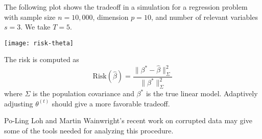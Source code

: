 \documentclass[12pt]{imsart}
\numberwithin{equation}{section}
\theoremstyle{plain}
\theoremstyle{remark}
\let\hat\widehat
\let\hat\widehat
\let\hat\widehat
\let\hat\widehat
\def\thetas#1{\theta^{(#1)}}
\begin{document}
The following plot shows the tradeoff in a simulation for a regression problem with
sample size $n=10{,}000$, dimension $p=10$, and number of relevant
variables $s=3$.  We take $T=5$.  

\begin{center}
  \texttt{[image: risk-theta]}
\end{center}

The risk is computed as
\begin{equation}
\text{Risk}(\hat \beta) = \frac{\|\beta^* - \hat\beta\|_{\Sigma}^2}{\|\beta^*\|_{\Sigma}^2}
\end{equation}
where $\Sigma$ is the population covariance and $\beta^*$ is the true
linear model. Adaptively adjusting $\thetas{t}$ should give a more
favorable tradeoff.

Po-Ling Loh and Martin Wainwright's recent work on corrupted data may
give some of the tools needed for analyzing this procedure.
\end{document}
